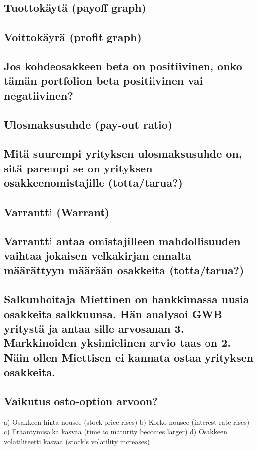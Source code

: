 \documentclass[a4paper]{article}
\begin{document}
\subsection{Tuottokäytä (payoff graph)}

\subsection{Voittokäyrä (profit graph)}

\subsection{Jos kohdeosakkeen beta on positiivinen, onko tämän portfolion beta positiivinen vai negatiivinen?}

\subsection{Ulosmaksusuhde (pay-out ratio)}

\subsection{Mitä suurempi yrityksen ulosmaksusuhde on, sitä parempi se on yrityksen osakkeenomistajille (totta/tarua?)}

\subsection{Varrantti (Warrant)}

\subsection{Varrantti antaa omistajilleen mahdollisuuden vaihtaa jokaisen velkakirjan ennalta määrättyyn määrään osakkeita (totta/tarua?)}

\subsection{Salkunhoitaja Miettinen on hankkimassa uusia osakkeita salkkuunsa. Hän analysoi GWB yritystä ja antaa sille arvosanan 3. Markkinoiden yksimielinen arvio taas on 2. Näin ollen Miettisen ei kannata ostaa yrityksen osakkeita.}

\subsection{Vaikutus osto-option arvoon?}
a) Osakkeen hinta nousee (stock price rises)
b) Korko nousee (interest rate rises)
c) Erääntymisaika kasvaa (time to maturity becomes larger)
d) Osakkeen volatiliteetti kasvaa (stock's volatility increases)
\end{document}
